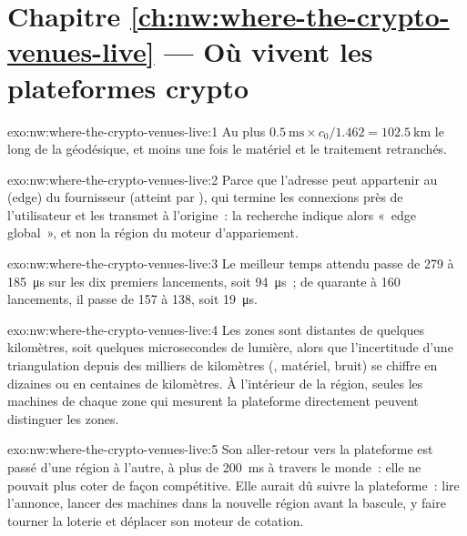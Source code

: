 \section*{Chapitre \ref{ch:nw:where-the-crypto-venues-live} --- Où vivent les plateformes crypto}

\begin{solution}{exo:nw:where-the-crypto-venues-live:1}
Au plus $0.5~\mathrm{ms} \times c_0 / 1.462 = \qty{102.5}{\kilo\metre}$ le long de la géodésique, et moins une fois le matériel et le traitement retranchés.
\end{solution}

\begin{solution}{exo:nw:where-the-crypto-venues-live:2}
Parce que l'adresse peut appartenir au  (edge) du fournisseur (atteint par ), qui termine les connexions près de l'utilisateur et les
transmet à l'origine~: la recherche indique alors «~edge global~», et non la région du moteur d'appariement.
\end{solution}

\begin{solution}{exo:nw:where-the-crypto-venues-live:3}
Le meilleur temps attendu passe de 279 à \qty{185}{\micro\second} sur les dix premiers lancements, soit \qty{94}{\micro\second}~; de quarante à 160 lancements, il passe
de 157 à 138, soit \qty{19}{\micro\second}.
\end{solution}

\begin{solution}{exo:nw:where-the-crypto-venues-live:4}
Les zones sont distantes de quelques kilomètres, soit quelques microsecondes de lumière, alors que l'incertitude d'une triangulation depuis des milliers de
kilomètres (, matériel, bruit) se chiffre en dizaines ou en centaines de kilomètres. À l'intérieur de la région, seules les machines
de chaque zone qui mesurent la plateforme directement peuvent distinguer les zones.
\end{solution}

\begin{solution}{exo:nw:where-the-crypto-venues-live:5}
Son aller-retour vers la plateforme est passé d'une région à l'autre, à plus de \qty{200}{\milli\second} à travers le monde~: elle ne pouvait plus coter de
façon compétitive. Elle aurait dû suivre la plateforme~: lire l'annonce, lancer des machines dans la nouvelle région avant la bascule, y faire tourner la
loterie et déplacer son moteur de cotation.
\end{solution}

